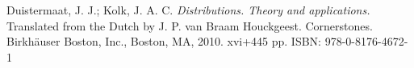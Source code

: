 \documentclass[twoside, a4paper, 10pt]{amsart}
\begin{document}
\begin{thebibliography}{99}

 Duistermaat, J. J.; Kolk, J. A. C. \emph{Distributions. Theory and applications.} Translated from the Dutch by J. P. van Braam Houckgeest. Cornerstones. Birkhäuser Boston, Inc., Boston, MA, 2010. xvi+445 pp. ISBN: 978-0-8176-4672-1 

\end{thebibliography} 
\end{document}

